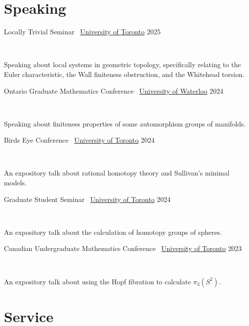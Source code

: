 \documentclass[]{style}
\begin{document}
\section{Speaking}

\begin{entrylist}

\vspace{1mm}

\entry
{Locally Trivial Seminar \ {\normalfont \underline{University of Toronto}}}
{2025}
{ ~ \vspace{-2.5mm}

Speaking about local systems in geometric topology, specifically relating to the Euler characteristic, the Wall finiteness obstruction, and the Whitehead torsion.}

\entry
{Ontario Graduate Mathematics Conference \ {\normalfont \underline{University of Waterloo}}}
{2024}
{ ~ \vspace{-2.5mm}

Speaking about finiteness properties of some automorphism groups of manifolds.}

\entry
{Birds Eye Conference \ {\normalfont \underline{University of Toronto}}}
{2024}
{ ~ \vspace{-2.5mm}

An expository talk about rational homotopy theory and Sullivan's minimal models.}

\entry
{Graduate Student Seminar \ {\normalfont \underline{University of Toronto}}}
{2024}
{ ~ \vspace{-2.5mm}

An expository talk about the calculation of homotopy groups of spheres.}

\entry
{Canadian Undergraduate Mathematics Conference \ {\normalfont \underline{University of Toronto}}}
{2023}
{ ~ \vspace{-2.5mm}

An expository talk about using the Hopf fibration to calculate $\pi_3(S^2)$.}

\end{entrylist}

\section{Service}
\end{document}
